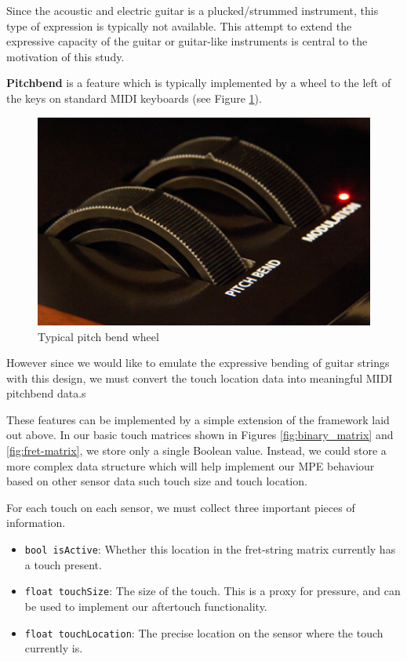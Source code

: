 Since the acoustic and electric guitar is a plucked/strummed instrument, this type of expression is typically not available. This attempt to extend the expressive capacity of the guitar or guitar-like instruments is central to the motivation of this study.

\textbf{Pitchbend} is a feature which is typically implemented by a wheel to the left of the keys on standard MIDI keyboards (see Figure \ref{fig:pitchwheel}).

\begin{figure}[h]
    \centering
    \includegraphics[scale=0.5]{Images/pitch bend.jpg}
    \caption{Typical pitch bend wheel}
    \label{fig:pitchwheel}
\end{figure}

However since we would like to emulate the expressive bending of guitar strings with this design, we must convert the touch location data into meaningful MIDI pitchbend data.s

These features can be implemented by a simple extension of the framework laid out above. In our basic touch matrices shown in Figures \ref{fig:binary_matrix} and \ref{fig:fret-matrix}, we store only a single Boolean value. Instead, we could store a more complex data structure which will help implement our MPE behaviour based on other sensor data such touch size and touch location. 

For each touch on each sensor, we must collect three important pieces of information. 

\begin{itemize}
    \item \texttt{bool isActive}: Whether this location in the fret-string matrix currently has a touch present.
    \item \texttt{float touchSize}: The size of the touch. This is a proxy for pressure, and can be used to implement our aftertouch functionality. 
    \item \texttt{float touchLocation}: The precise location on the sensor where the touch currently is.  
\end{itemize}

